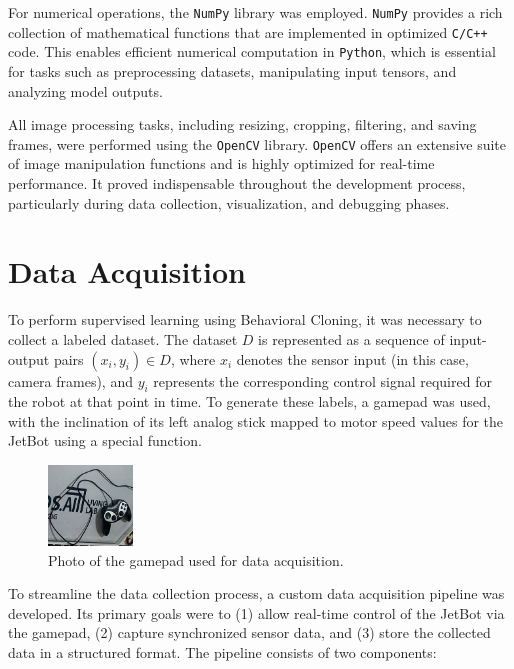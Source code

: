 For numerical operations, the \texttt{NumPy} library was employed. \texttt{NumPy} provides a rich collection of mathematical functions that are implemented in optimized \texttt{C/C++} code. This enables efficient numerical computation in \texttt{Python}, which is essential for tasks such as preprocessing datasets, manipulating input tensors, and analyzing model outputs.

All image processing tasks, including resizing, cropping, filtering, and saving frames, were performed using the \texttt{OpenCV} library. \texttt{OpenCV} offers an extensive suite of image manipulation functions and is highly optimized for real-time performance. It proved indispensable throughout the development process, particularly during data collection, visualization, and debugging phases.

\section{Data Acquisition}

To perform supervised learning using Behavioral Cloning, it was necessary to collect a labeled dataset. The dataset \( D \) is represented as a sequence of input-output pairs \( (x_i, y_i) \in D \), where \( x_i \) denotes the sensor input (in this case, camera frames), and \( y_i \) represents the corresponding control signal required for the robot at that point in time. To generate these labels, a gamepad was used, with the inclination of its left analog stick mapped to motor speed values for the JetBot using a special function.

\begin{figure}[htbp]
  \centering
  \includegraphics[width=0.2\textwidth]{Images/JetBot/gamepad.jpeg}
  \caption{Photo of the gamepad used for data acquisition.}
  \label{fig:gamepad}
\end{figure}

To streamline the data collection process, a custom data acquisition pipeline was developed. Its primary goals were to (1) allow real-time control of the JetBot via the gamepad, (2) capture synchronized sensor data, and (3) store the collected data in a structured format. The pipeline consists of two components:

